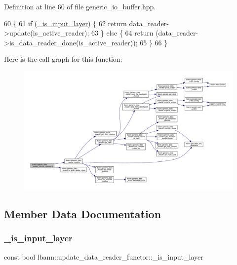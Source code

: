 Definition at line 60 of file generic\+\_\+io\+\_\+buffer.\+hpp.


\begin{DoxyCode}
60                                                                                  \{
61     \textcolor{keywordflow}{if} (\hyperlink{classlbann_1_1update__data__reader__functor_a5a8bc619956adeeeb988e2e6eaa95ca4}{\_is\_input\_layer}) \{
62       \textcolor{keywordflow}{return} data\_reader->update(is\_active\_reader);
63     \} \textcolor{keywordflow}{else} \{
64       \textcolor{keywordflow}{return} (data\_reader->is\_data\_reader\_done(is\_active\_reader));
65     \}
66   \}
\end{DoxyCode}
Here is the call graph for this function\+:\nopagebreak
\begin{figure}[H]
\begin{center}
\leavevmode
\includegraphics[width=350pt]{classlbann_1_1update__data__reader__functor_af7bb363237370dd7b84364fea740bcdf_cgraph}
\end{center}
\end{figure}


\subsection{Member Data Documentation}
\mbox{\label{classlbann_1_1update__data__reader__functor_a5a8bc619956adeeeb988e2e6eaa95ca4}} 
\subsubsection{\texorpdfstring{\+\_\+is\+\_\+input\+\_\+layer}{\_is\_input\_layer}}
{\footnotesize\ttfamily const bool lbann\+::update\+\_\+data\+\_\+reader\+\_\+functor\+::\+\_\+is\+\_\+input\+\_\+layer\hspace{0.3cm}{\ttfamily [private]}}



